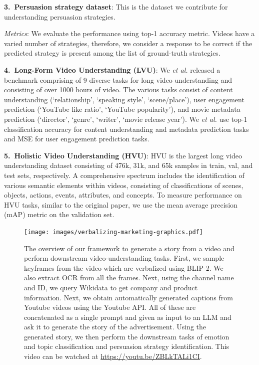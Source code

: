 \documentclass[hidelinks,11pt,a4paper]{report}
\renewcommand{\cite}[1]{\citep{#1}}
\begin{document}
\textbf{3.~Persuasion strategy dataset}: This is the dataset we contribute for understanding persuasion strategies.

\textit{Metrics}: We evaluate the performance using top-1 accuracy metric. Videos have a varied number of strategies, therefore, we consider a response to be correct if the predicted strategy is present among the list of ground-truth strategies.


\textbf{4.~Long-Form Video Understanding (LVU)}: We \textit{et al.} \cite{wu2021towards} released a benchmark comprising of 9 diverse tasks for long video understanding and consisting of over 1000 hours of video. The various tasks consist of content understanding (`relationship', `speaking style', `scene/place'), user engagement prediction (`YouTube like ratio', `YouTube popularity'), and movie metadata prediction (`director', `genre', `writer', `movie release year'). We \textit{et al.} \cite{wu2021towards} use top-1 classification accuracy for content understanding and metadata prediction tasks and MSE for user engagement prediction tasks.


\textbf{5.~Holistic Video Understanding (HVU)}: 
HVU \cite{diba2020large} is the largest long video understanding dataset consisting of 476k, 31k, and 65k samples in train, val, and test sets, respectively. A comprehensive spectrum includes the identification of various semantic elements within videos, consisting of classifications of scenes, objects, actions, events, attributes, and concepts. To measure performance on HVU tasks, similar to the original paper, we use the mean average precision (mAP) metric on the validation set.




\begin{figure}[!t]
  \texttt{[image: images/verbalizing-marketing-graphics.pdf]}
  \caption{The overview of our framework to generate a story from a video and perform downstream video-understanding tasks. First, we sample keyframes from the video which are verbalized using BLIP-2. We also extract OCR from all the frames. Next, using the channel name and ID, we query Wikidata to get company and product information. Next, we obtain automatically generated captions from Youtube videos using the Youtube API. All of these are concatenated as a single prompt and given as input to an LLM and ask it to generate the story of the advertisement. Using the generated story, we then perform the downstream tasks of emotion and topic classification and persuasion strategy identification. This video can be watched at \url{https://youtu.be/ZBLkTALi1CI}.
  }
  \label{fig:story-generation-pipeline}
\end{figure}
\end{document}

